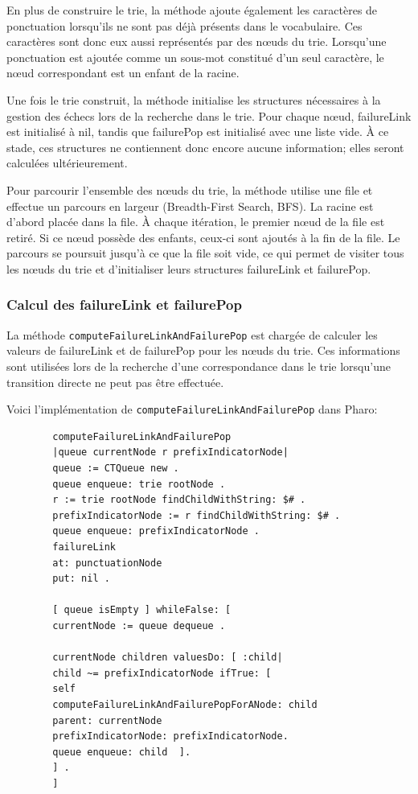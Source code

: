 \documentclass[12pt,a4paper]{report}
\begin{document}
	En plus de construire le trie, la méthode ajoute également les caractères de ponctuation lorsqu'ils ne sont pas déjà présents dans le vocabulaire. Ces caractères sont donc eux aussi représentés par des nœuds du trie. Lorsqu'une ponctuation est ajoutée comme un sous-mot constitué d'un seul caractère, le nœud correspondant est un enfant de la racine.
	
	Une fois le trie construit, la méthode initialise les structures nécessaires à la gestion des échecs lors de la recherche dans le trie. Pour chaque nœud, failureLink est initialisé à nil, tandis que failurePop est initialisé avec une liste vide. À ce stade, ces structures ne contiennent donc encore aucune information; elles seront calculées ultérieurement.
	
	Pour parcourir l'ensemble des nœuds du trie, la méthode utilise une file et effectue un parcours en largeur (Breadth-First Search, BFS). La racine est d'abord placée dans la file. À chaque itération, le premier nœud de la file est retiré. Si ce nœud possède des enfants, ceux-ci sont ajoutés à la fin de la file. Le parcours se poursuit jusqu'à ce que la file soit vide, ce qui permet de visiter tous les nœuds du trie et d'initialiser leurs structures failureLink et failurePop.
	
	\subsubsection{Calcul des failureLink et failurePop}
	
	La méthode \texttt{computeFailureLinkAndFailurePop} est chargée de calculer les valeurs de failureLink et de failurePop pour les nœuds du trie. Ces informations sont utilisées lors de la recherche d'une correspondance dans le trie lorsqu'une transition directe ne peut pas être effectuée.
	
		Voici l'implémentation de \texttt{computeFailureLinkAndFailurePop} dans Pharo:
	
	\begin{verbatim}
		computeFailureLinkAndFailurePop
		|queue currentNode r prefixIndicatorNode|
		queue := CTQueue new .
		queue enqueue: trie rootNode .
		r := trie rootNode findChildWithString: $# .
		prefixIndicatorNode := r findChildWithString: $# .
		queue enqueue: prefixIndicatorNode .
		failureLink
		at: punctuationNode
		put: nil .
		
		[ queue isEmpty ] whileFalse: [
		currentNode := queue dequeue .
		
		currentNode children valuesDo: [ :child|
		child ~= prefixIndicatorNode ifTrue: [
		self
		computeFailureLinkAndFailurePopForANode: child
		parent: currentNode
		prefixIndicatorNode: prefixIndicatorNode.
		queue enqueue: child  ].
		] .
		]
	\end{verbatim}
	
\end{document}
